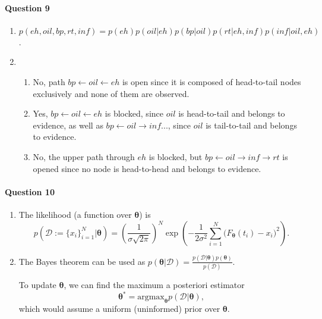\documentclass{article}
\begin{document}
\paragraph{Question 9}
\begin{enumerate}
	\item $p(eh,oil,bp,rt,inf)=p(eh)p(oil|eh)p(bp|oil)p(rt|eh,inf)p(inf|oil,eh)$.
    \item \begin{enumerate}
        \item No, path $bp\leftarrow oil\leftarrow eh $ is open since it is composed of head-to-tail nodes exclusively and none of them are observed.
        \item Yes, $bp\leftarrow oil\leftarrow eh $ is blocked, since $oil$ is head-to-tail and belongs to evidence, as well as $bp\leftarrow oil\rightarrow inf ...$, since $oil$ is tail-to-tail and belongs to evidence.
        \item No, the upper path through $eh$ is blocked, but  $bp\leftarrow oil\rightarrow inf \rightarrow rt$ is opened since no node is head-to-head and belongs to evidence. 
    \end{enumerate}
\end{enumerate}


\paragraph{Question 10}
\begin{enumerate}
\item The likelihood (a function over $\boldsymbol{\theta}$) is 
$$p(\mathcal{D}:=\{x_i\}_{i=1}^N|\boldsymbol{\theta}) = \left(\frac{1}{\sigma\sqrt{2\pi}}\right)^N \exp\left(-\frac{1}{2\sigma^2}\sum_{i=1}^N {(F_{\boldsymbol{\theta}}(t_i)-x_i})^2\right).$$
\item The Bayes theorem can be used as
$p(\boldsymbol{\theta}|\mathcal{D}) = \frac{p(\mathcal{D}|\boldsymbol{\theta})p(\boldsymbol{\theta})}{p(\mathcal{D})}$.

To update $\boldsymbol{\theta}$, we can find the maximum a posteriori estimator $$\boldsymbol{\theta}^*=\text{argmax}_{\boldsymbol{\theta}} p(\mathcal{D}|\boldsymbol{\theta}),$$
which would assume a uniform (uninformed) prior over $\boldsymbol{\theta}$.
\end{enumerate}
\end{document}
